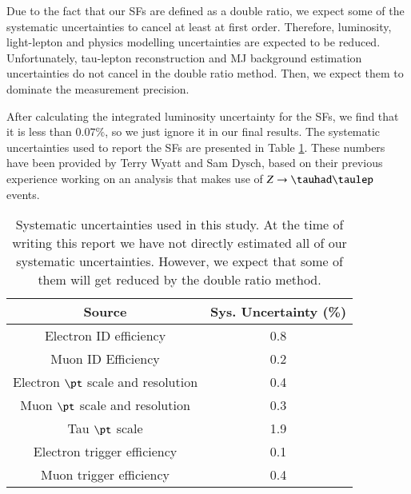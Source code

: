 Due to the fact that our SFs are defined as a double ratio, we expect some of the systematic uncertainties to cancel at least at first order. Therefore, luminosity, light-lepton and physics modelling uncertainties are expected to be reduced. Unfortunately, tau-lepton reconstruction and MJ background estimation uncertainties do not cancel in the double ratio method. Then, we expect them to dominate the measurement precision.

After calculating the integrated luminosity uncertainty for the SFs, we find that it is less than $0.07\%$, so we just ignore it in our final results. The systematic uncertainties used to report the SFs are presented in Table \ref{Tab5}. These numbers have been provided by Terry Wyatt and Sam Dysch, based on their previous experience working on an analysis that makes use of $Z\to\tauhad\taulep$ events.
\begin{table}[htbp]
	\centering
	\begin{tabular}{cc}
		\hline
		\multicolumn{1}{|c|}{Source}        & \multicolumn{1}{c|}{Sys. Uncertainty (\%)} \\ \hline
		Electron ID efficiency              & 0.8                                        \\
		Muon ID Efficiency                  & 0.2                                        \\
		Electron $\pt$ scale and resolution & 0.4                                        \\
		Muon $\pt$ scale and resolution     & 0.3                                        \\
		Tau $\pt$ scale                     & 1.9                                        \\
		Electron trigger efficiency         & 0.1                                        \\
		Muon trigger efficiency             & 0.4                                        \\ 
	\end{tabular}
	\caption{Systematic uncertainties used in this study. At the time of writing this report we have not directly estimated all of our systematic uncertainties. However, we expect that some of them will get reduced by the double ratio method.}
	\label{Tab5}
\end{table}

